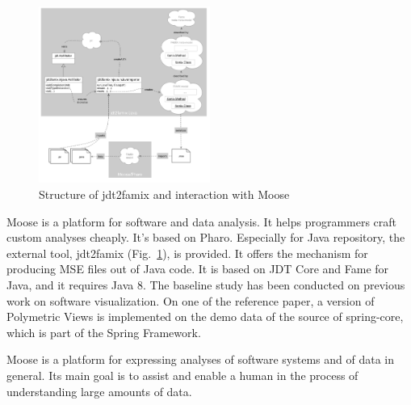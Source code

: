 \documentclass{sig-alternate}
\begin{document}
\begin{figure}
\centering
\includegraphics[width=0.5\textwidth]{eva1.png}
\caption{Structure of jdt2famix and interaction with Moose}
\label{fig:structure of jdt2famix and interaction with Moose}
\end{figure}

Moose is a platform for software and data analysis. It helps programmers craft custom analyses cheaply. It's based on Pharo. Especially for Java repository, the external tool, jdt2famix  (Fig.~\ref{fig:structure of jdt2famix and interaction with Moose}), is provided. It offers the mechanism for producing MSE files out of Java code. It is based on JDT Core and Fame for Java, and it requires Java 8. The baseline study has been conducted on previous work on software visualization. On one of the reference paper, a version of Polymetric Views is implemented on the demo data of the source of spring-core, which is part of the Spring Framework.

Moose is a platform for expressing analyses of software systems and of data in general. Its main goal is to assist and enable a human in the process of understanding large amounts of data.
\end{document}
